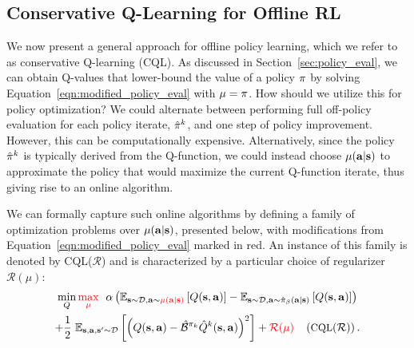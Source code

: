 \vspace{-5pt}
\subsection{Conservative Q-Learning for Offline RL}
\label{sec:framework}
\vspace{-5pt}
We now present a general approach for offline policy learning, which we refer to as conservative Q-learning (CQL). 
As discussed in Section~\ref{sec:policy_eval}, we can obtain Q-values that lower-bound the value of a policy $\pi$
by solving Equation~\ref{eqn:modified_policy_eval} with $\mu = \pi$. How should we utilize this for policy optimization? We could alternate between performing full off-policy evaluation for each policy iterate, $\hat{\pi}^k$, and one step of policy improvement. However, this can be computationally expensive. Alternatively, since the policy $\hat{\pi}^k$ is typically derived from the Q-function, we could instead choose $\mu(\mathbf{a}|\mathbf{s})$ to approximate the policy that would maximize the current Q-function iterate, 
thus giving rise to an online algorithm.

We can formally capture such online algorithms by defining a family of optimization problems over $\mu(\mathbf{a}|\mathbf{s})$, presented below, with modifications from Equation~\ref{eqn:modified_policy_eval} marked in red. An instance of this family is denoted by CQL($\mathcal{R}$) and is characterized by a particular choice of regularizer $\mathcal{R}(\mu)$:
\begin{multline}
    \label{eqn:cql_framework}
    \small{\min_{Q} \textcolor{red}{\max_{\mu}}~~ \alpha \left(\mathbb{E}_{\mathbf{s}\sim \mathcal{D}, \mathbf{a}\sim \textcolor{red}{\mu(\mathbf{a}|\mathbf{s})}}\left[Q(\mathbf{s}, \mathbf{a})\right] - \mathbb{E}_{\mathbf{s}\sim \mathcal{D}, \mathbf{a}\sim \hat{\pi}_\beta(\mathbf{a}|\mathbf{s})}\left[Q(\mathbf{s}, \mathbf{a})\right] \right)}\\
    \small{+ \frac{1}{2}~ \mathbb{E}_{\mathbf{s}, \mathbf{a}, \mathbf{s}' \sim \mathcal{D}}\left[\left(Q(\mathbf{s}, \mathbf{a}) - \hat{\mathcal{B}}^{\pi_k} \hat{Q}^{k} (\mathbf{s}, \mathbf{a}) \right)^2 \right] + \textcolor{red}{\mathcal{R}(\mu)} ~~~ \left(\text{CQL}(\mathcal{R})\right).}
\end{multline}

